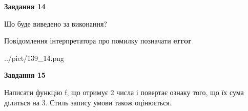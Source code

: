 \documentclass[11pt, ukrainian]{article}
\begin{document}
{\begin {large}
{\begin {center}\textbf{Завдання 14}\end {center}}\par
Що буде виведено за виконання? \par
Повідомлення інтерпретатора про помилку позначати \textbf{error}

\begin{center}
	{../pict/139_14.png}
\end{center}
\newpage

{\begin {center}\textbf{Завдання 15}\end {center}}\par

Написати функцiю f, що отримує 2 числа і повертає ознаку того, що їх сума дiлиться на 3. Стиль запису умови також оцінюється.\par
\newpage

\end {large}}
\end{document}
